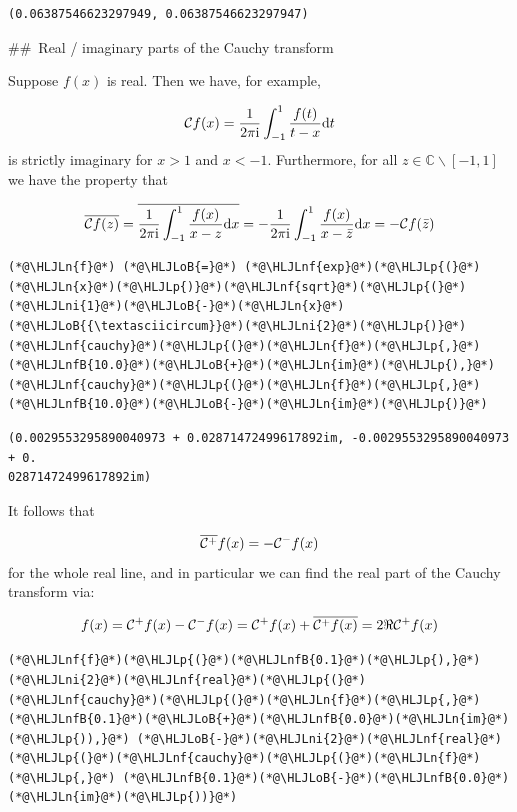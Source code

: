 \documentclass[12pt,a4paper]{article}
\newcommand{\HLJLn}[1]{#1}
\newcommand{\HLJLnf}[1]{\textcolor[RGB]{66,102,213}{#1}}
\newcommand{\HLJLnfB}[1]{\textcolor[RGB]{59,151,46}{#1}}
\newcommand{\HLJLni}[1]{\textcolor[RGB]{59,151,46}{#1}}
\newcommand{\HLJLoB}[1]{\textcolor[RGB]{102,102,102}{\textbf{#1}}}
\newcommand{\HLJLp}[1]{#1}
\def\D{ {\rm d} }
\def\I{ {\rm i} }
\def\C{ {\mathbb C} }
\def\CC{ {\cal C} }
\def\dx{\D x}
\def\dt{\D t}
\begin{document}
\begin{lstlisting}
(0.06387546623297949, 0.06387546623297947)
\end{lstlisting}


\#\# Real / imaginary parts of the Cauchy transform

Suppose $f(x)$ is real. Then we have, for example,

\[
\CC f(x) = {1 \over 2 \pi \I} \int_{-1}^1 {f(t) \over t- x} \dt
\]
is strictly imaginary for $x > 1$ and $x < -1$.  Furthermore, for all $z \in \C \backslash [-1,1]$ we have the property that

\[
\overline{\CC f( z)} = \overline{{1 \over 2 \pi \I} \int_{-1}^1 {f(x) \over x - z} \dx} = 
-{1 \over 2 \pi \I} \int_{-1}^1 {f(x) \over x - \bar z} \dx = - \CC f(\bar z)
\]

\begin{lstlisting}
(*@\HLJLn{f}@*) (*@\HLJLoB{=}@*) (*@\HLJLnf{exp}@*)(*@\HLJLp{(}@*)(*@\HLJLn{x}@*)(*@\HLJLp{)}@*)(*@\HLJLnf{sqrt}@*)(*@\HLJLp{(}@*)(*@\HLJLni{1}@*)(*@\HLJLoB{-}@*)(*@\HLJLn{x}@*)(*@\HLJLoB{{\textasciicircum}}@*)(*@\HLJLni{2}@*)(*@\HLJLp{)}@*)
(*@\HLJLnf{cauchy}@*)(*@\HLJLp{(}@*)(*@\HLJLn{f}@*)(*@\HLJLp{,}@*) (*@\HLJLnfB{10.0}@*)(*@\HLJLoB{+}@*)(*@\HLJLn{im}@*)(*@\HLJLp{),}@*) (*@\HLJLnf{cauchy}@*)(*@\HLJLp{(}@*)(*@\HLJLn{f}@*)(*@\HLJLp{,}@*) (*@\HLJLnfB{10.0}@*)(*@\HLJLoB{-}@*)(*@\HLJLn{im}@*)(*@\HLJLp{)}@*)
\end{lstlisting}

\begin{lstlisting}
(0.0029553295890040973 + 0.02871472499617892im, -0.0029553295890040973 + 0.
02871472499617892im)
\end{lstlisting}


It follows that

\[
\overline{\CC^+} f(x) = - \CC^- f(x)
\]
for the whole real line, and in particular we can find the real part of the Cauchy transform via: 

\[
f(x) = \CC^+ f(x) - \CC^- f(x) = \CC^+ f(x) + \overline{\CC^+ f(x)} = 2 \Re \CC^+ f(x)
\]

\begin{lstlisting}
(*@\HLJLnf{f}@*)(*@\HLJLp{(}@*)(*@\HLJLnfB{0.1}@*)(*@\HLJLp{),}@*) (*@\HLJLni{2}@*)(*@\HLJLnf{real}@*)(*@\HLJLp{(}@*)(*@\HLJLnf{cauchy}@*)(*@\HLJLp{(}@*)(*@\HLJLn{f}@*)(*@\HLJLp{,}@*) (*@\HLJLnfB{0.1}@*)(*@\HLJLoB{+}@*)(*@\HLJLnfB{0.0}@*)(*@\HLJLn{im}@*)(*@\HLJLp{)),}@*) (*@\HLJLoB{-}@*)(*@\HLJLni{2}@*)(*@\HLJLnf{real}@*)(*@\HLJLp{(}@*)(*@\HLJLnf{cauchy}@*)(*@\HLJLp{(}@*)(*@\HLJLn{f}@*)(*@\HLJLp{,}@*) (*@\HLJLnfB{0.1}@*)(*@\HLJLoB{-}@*)(*@\HLJLnfB{0.0}@*)(*@\HLJLn{im}@*)(*@\HLJLp{))}@*)
\end{lstlisting}
\end{document}
